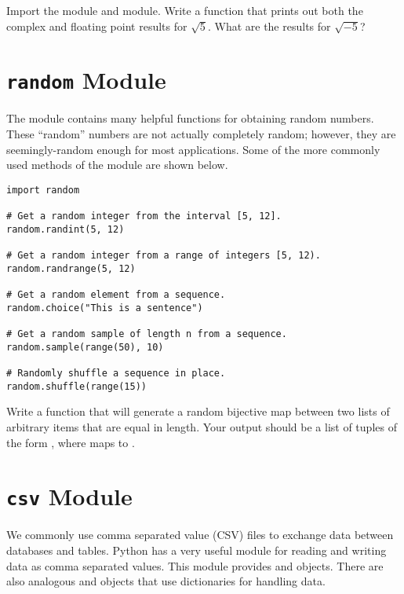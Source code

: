 \begin{problem}
Import the  module and  module. Write a function that prints out both the complex and floating point results for $\sqrt{5}$.  What are the results for $\sqrt{-5}$?
\end{problem}

\section*{\texttt{random} Module}
The  module contains many helpful functions for obtaining random numbers.
These ``random'' numbers are not actually completely random; however, they are seemingly-random enough for most applications.
Some of the more commonly used methods of the  module are shown below.
\begin{lstlisting}
import random

# Get a random integer from the interval [5, 12].
random.randint(5, 12)

# Get a random integer from a range of integers [5, 12).
random.randrange(5, 12)

# Get a random element from a sequence.
random.choice("This is a sentence")

# Get a random sample of length n from a sequence.
random.sample(range(50), 10)

# Randomly shuffle a sequence in place.
random.shuffle(range(15))
\end{lstlisting}
\begin{comment}
The \li{random} module has functions that can sample from a variety of different statistical distributions such as: uniform, normal, beta, gamma, exponential, etc.
\end{comment}

\begin{problem}
Write a function that will generate a random bijective map between two lists of arbitrary items that are equal in length. Your
output should be a list of tuples of the form , where  maps to .
\label{prob:random_map}
\end{problem}

\section*{\texttt{csv} Module}
We commonly use comma separated value (CSV) files to exchange data between databases and tables.
Python has a very useful module for reading and writing data as comma separated values.
This  module provides  and  objects.
There are also analogous  and  objects that use dictionaries for handling data.

